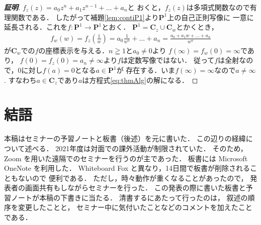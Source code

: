 \documentclass[11pt, a4paper, dvipdfmx, draft]{jsarticle}
\theoremstyle{definition}
\newcommand{\cc}{\mathbf{C}}
\newcommand{\pp}{\mathbf{P}}
\theoremstyle{mystyle}
\numberwithin{equation}{section} %
\begin{document}
\begin{proof}[\bf{証明}]
    $f_{z}(z)=a_{0}z^{n}+a_{1}z^{n-1}+\dots +a_{n}$と
    おくと，$f_z(z)$は多項式関数なので有理関数である．
    したがって補題\ref{lem:contiP1}より$\pp^1$上の自己正則写像に
    一意に延長される．これを$f\colon\pp^1\to\pp^1$とおく．
    $\pp^1=\cc_z\cup\cc_w$とかくとき，
    \begin{align*}
        f_w(w)=f_z\left(\frac{1}{w}\right)
        =a_0\frac{1}{w^n}+\dots+a_n
        =\frac{a_0+a_1w+\dots+a_n}{w^n}
    \end{align*}
    が$\cc_w$での$f$の座標表示を与える．$n\geqq1$と$a_0\ne0$より
    $f(\infty)=f_w(0)=\infty$であり，
    $f(0)=f_z(0)=a_n\ne\infty$より$f$は定数写像ではない．
    従って$f$は全射なので，$0$に対し$f(a)=0$となる$a\in\pp^1$が
    存在する．いま$f(\infty)=\infty$なので$a\ne\infty$. 
    すなわち$a\in\cc_z$であり$a$は方程式\eqref{eq:thmAlg}の解になる．
\end{proof}

\section{結語}
本稿はセミナーの予習ノートと板書（後述）を元に書いた．
この辺りの経緯について述べる．
2021年度は対面での課外活動が制限されていた．
そのため，Zoom を用いた遠隔でのセミナーを行うのが主であった．
板書には Microsoft OneNote を利用した．
Whiteboard Fox と異なり，14日間で板書が削除されることもないので
便利である．
ただし，時々動作が重くなることがあったので，
発表者の画面共有もしながらセミナーを行った．
この発表の際に書いた板書と予習ノートが本稿の下書きに当たる．
清書するにあたって行ったのは，
叙述の順序を変更したことと，
セミナー中に気付いたことなどのコメントを加えたことである．
\end{document}
